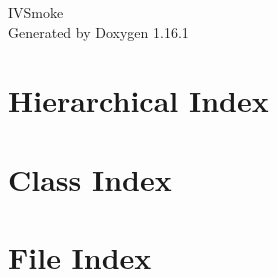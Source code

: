 \documentclass[twoside]{book}
\newcommand{\+}{\discretionary{\mbox{\scriptsize$\hookleftarrow$}}{}{}}
\newcommand{\clearemptydoublepage}{%
    \newpage{\pagestyle{empty}\cleardoublepage}%
  }
\begin{document}
  \raggedbottom
    \hypersetup{pageanchor=false,
                bookmarksnumbered=true,
                pdfencoding=unicode
               }
  \begin{titlepage}
  \vspace*{7cm}
  \begin{center}%
  {\Large IVSmoke}\\
  \vspace*{1cm}
  {\large Generated by Doxygen 1.16.1}\\
  \end{center}
  \end{titlepage}
  \clearemptydoublepage
  \tableofcontents
  \clearemptydoublepage
  \hypersetup{pageanchor=true}


\chapter{Hierarchical Index}

\chapter{Class Index}

\chapter{File Index}

\end{document}
